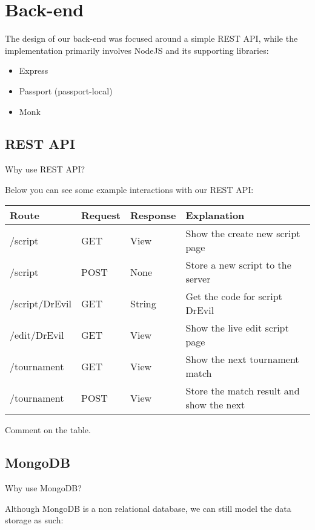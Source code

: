 \section{Back-end}

The design of our back-end was focused around a simple REST API, while the implementation primarily involves NodeJS and its supporting libraries:
	\begin{itemize}
	        \item Express
		\item Passport (passport-local)
		\item Monk		
	\end{itemize}

\subsection{REST API}
Why use REST API?

Below you can see some example interactions with our REST API:\\

\begin{center}
\begin{tabular}{| l | l | l | l |}\hline
Route & Request &  Response & Explanation\\\hline\hline
/script & GET & View & Show the create new script page\\\hline
/script & POST & None & Store a new script to the server\\\hline
/script/DrEvil & GET & String & Get the code for script DrEvil\\\hline
/edit/DrEvil & GET & View & Show the live edit script page\\\hline
/tournament & GET & View & Show the next tournament match\\\hline
/tournament & POST & View & Store the match result and show the next \\\hline
\end{tabular}
\end{center}

Comment on the table.

\subsection{MongoDB}
Why use MongoDB?

Although MongoDB is a non relational database, we can still model the data storage as such:

